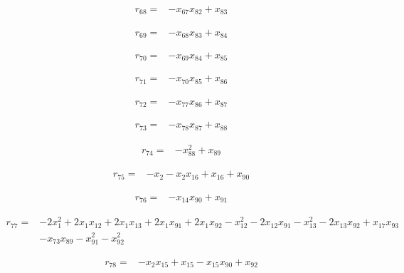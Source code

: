 \begin{align*}
r_{68}={}&-x_{67}x_{82}+x_{83}
\end{align*}

\begin{align*}
r_{69}={}&-x_{68}x_{83}+x_{84}
\end{align*}

\begin{align*}
r_{70}={}&-x_{69}x_{84}+x_{85}
\end{align*}

\begin{align*}
r_{71}={}&-x_{70}x_{85}+x_{86}
\end{align*}

\begin{align*}
r_{72}={}&-x_{77}x_{86}+x_{87}
\end{align*}

\begin{align*}
r_{73}={}&-x_{78}x_{87}+x_{88}
\end{align*}

\begin{align*}
r_{74}={}&-x_{88}^{2}+x_{89}
\end{align*}

\begin{align*}
r_{75}={}&-x_{2}-x_{2}x_{16}+x_{16}+x_{90}
\end{align*}

\begin{align*}
r_{76}={}&-x_{14}x_{90}+x_{91}
\end{align*}

\begin{align*}
r_{77}={}&-2x_{1}^{2}+2x_{1}x_{12}+2x_{1}x_{13}+2x_{1}x_{91}+2x_{1}x_{92}-x_{12}^{2}-2x_{12}x_{91}-x_{13}^{2}-2x_{13}x_{92}+x_{17}x_{93}\\
&-x_{73}x_{89}-x_{91}^{2}-x_{92}^{2}
\end{align*}

\begin{align*}
r_{78}={}&-x_{2}x_{15}+x_{15}-x_{15}x_{90}+x_{92}
\end{align*}

